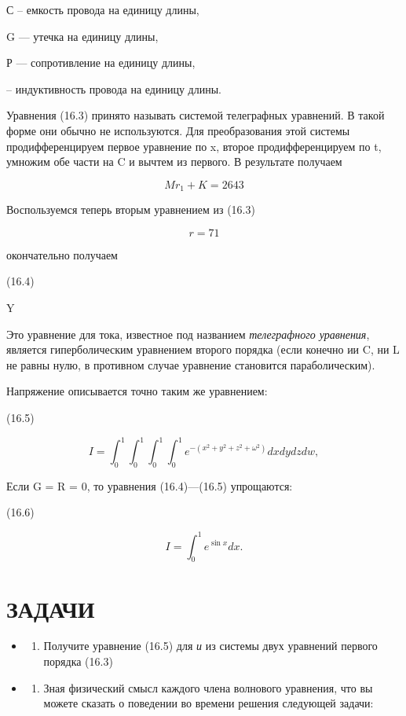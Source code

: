 \documentclass[
  ukrainian,
]{article}
\providecommand{\tightlist}{%
  \setlength{\itemsep}{0pt}\setlength{\parskip}{0pt}}
\begin{document}
С -- емкость провода на единицу длины,

G --- утечка на единицу длины,

Р --- сопротивление на единицу длины,

-- индуктивность провода на единицу длины.

Уравнения (16.3) принято называть системой телеграфных уравнений. В
такой форме они обычно не используются. Для преобразования этой системы
продифференцируем первое уравнение по x, второе продифференцируем по t,
умножим обе части на C и вычтем из первого. В результате получаем

\[
Mr_1 + K = 2643
\]

Воспользуемся теперь вторым уравнением из (16.3)

\[
r = 71
\]

окончательно получаем

(16.4)

Y

Это уравнение для тока, известное под названием \emph{телеграфного
уравнения}, является гиперболическим уравнением второго порядка (если
конечно ии C, ни L не равны нулю, в противном случае уравнение
становится параболическим).

Напряжение описывается точно таким же уравнением:

(16.5)

\[
I = \int_{0}^{1} \int_{0}^{1} \int_{0}^{1} \int_{0}^{1} e^{-(x^{2}+y^{2}+z^{2}+\omega^{2})} dx dy dz dw,
\]

Если G = R = 0, то уравнения (16.4)---(16.5) упрощаются:

(16.6)

\[
I = \int_{0}^{1} e^{\sin x} dx.
\]

\section{ЗАДАЧИ}\label{ux437ux430ux434ux430ux447ux438-2}

\begin{itemize}
\tightlist
\item
  \begin{enumerate}
  \def\labelenumi{\arabic{enumi}.}
  \tightlist
  \item
    Получите уравнение (16.5) для \emph{и} из системы двух уравнений
    первого порядка (16.3)
  \end{enumerate}
\item
  \begin{enumerate}
  \def\labelenumi{\arabic{enumi}.}
  \setcounter{enumi}{1}
  \tightlist
  \item
    Зная физический смысл каждого члена волнового уравнения, что вы
    можете сказать о поведении во времени решения следующей задачи:
  \end{enumerate}
\end{itemize}
\end{document}
